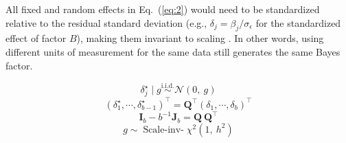 \documentclass[preprint,12pt,authoryear]{elsarticle}
\begin{document}
All fixed and random effects in Eq.~(\ref{eq:2}) would need to be standardized relative to the residual standard deviation (e.g., $\delta_j=\beta_j/\sigma_\epsilon$ for the standardized effect of factor $B$), making them invariant to scaling \citetext{%
	\citealp{jeffreys_theory_1961}; %
	\citealp[p.~359]{rouder_default_2012}; %
	but see debate in \citealp{van_doorn_bayes_2023-2}}.
In other words, using different units of measurement for the same data still generates the same Bayes factor.

\begin{equation} \label{eq:5}
	\delta_j^\star\mid g\overset{\mathrm{i.i.d.}}{\sim}\mathcal{N}(0,\ \!g)
\end{equation}
\begin{equation} \label{eq:6}
	(\delta_1^\star,\dotsb,\delta_{b-1}^\star)^\top=\mathbf{Q}^\top(\delta_1,\dotsb,\delta_{b})^\top
\end{equation}
\begin{equation} \label{eq:7}
	\mathbf{I}_b-b^{-1}\mathbf{J}_b=\mathbf{Q}\ \!\mathbf{Q}^\top
\end{equation}
\begin{equation} \label{eq:8}
	g\sim\operatorname{Scale-inv-}\chi^2(1,\ \!h^2)
\end{equation}
\end{document}
